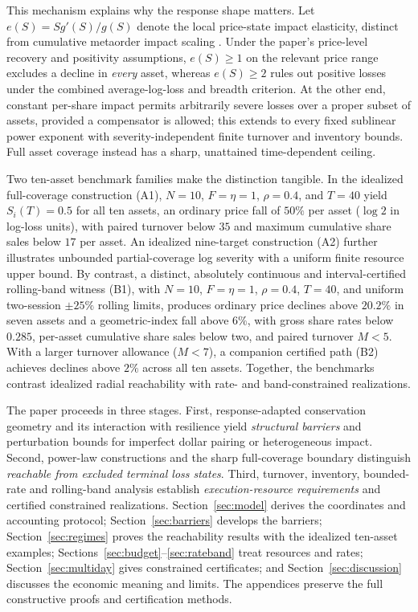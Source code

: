 \documentclass[review,hidelinks,onefignum,onetabnum]{siamonline250211}
\begin{document}


This mechanism explains why the response shape matters. Let
$e(S)=Sg'(S)/g(S)$ denote the local price-state impact elasticity,
distinct from cumulative metaorder impact scaling
\citep{BucciEtAl2019,KyleObizhaeva2023}.
Under the paper's
price-level recovery and positivity assumptions, $e(S)\ge1$ on the
relevant price range excludes a decline in \emph{every} asset,
whereas $e(S)\ge2$ rules out positive losses under the combined
average-log-loss and breadth criterion. At the other end, constant
per-share impact permits arbitrarily severe losses over a proper
subset of assets, provided a compensator is allowed; this extends
to every fixed sublinear power exponent with severity-independent
finite turnover and inventory bounds. Full asset coverage instead
has a sharp, unattained time-dependent ceiling.

Two ten-asset benchmark families make the distinction tangible.
In the idealized full-coverage construction (A1),
$N=10$, $F=\eta=1$, $\rho=0.4$, and $T=40$ yield
$S_i(T)=0.5$ for all ten assets, an ordinary price fall of
$50\%$ per asset ($\log2$ in log-loss units), with paired turnover below $35$ and maximum cumulative
share sales below $17$ per asset. An idealized
nine-target construction (A2) further illustrates unbounded
partial-coverage log severity with a uniform finite resource
upper bound. By contrast, a distinct, absolutely continuous
and interval-certified rolling-band witness (B1), with
$N=10$, $F=\eta=1$, $\rho=0.4$, $T=40$, and uniform
two-session $\pm25\%$ rolling limits, produces ordinary price
declines above $20.2\%$ in seven assets and a geometric-index
fall above $6\%$, with gross share rates below $0.285$,
per-asset cumulative share sales below two, and
paired turnover $M<5$. With a larger turnover allowance
($M<7$), a companion certified path (B2) achieves
declines above $2\%$ across all ten assets. Together,
the benchmarks contrast idealized radial reachability
with rate- and band-constrained realizations.

The paper proceeds in three stages.
First, response-adapted conservation geometry and its
interaction with resilience yield \emph{structural barriers}
and perturbation bounds for imperfect dollar pairing or
heterogeneous impact. Second, power-law constructions and
the sharp full-coverage boundary distinguish \emph{reachable
from excluded terminal loss states}. Third, turnover,
inventory, bounded-rate and rolling-band analysis establish
\emph{execution-resource requirements} and certified
constrained realizations. Section~\ref{sec:model} derives
the coordinates and accounting protocol; Section~\ref{sec:barriers}
develops the barriers; Section~\ref{sec:regimes} proves the
reachability results with the idealized ten-asset examples;
Sections~\ref{sec:budget}--\ref{sec:rateband} treat
resources and rates; Section~\ref{sec:multiday} gives
constrained certificates; and Section~\ref{sec:discussion}
discusses the economic meaning and limits. The appendices
preserve the full constructive proofs and certification methods.
\end{document}
